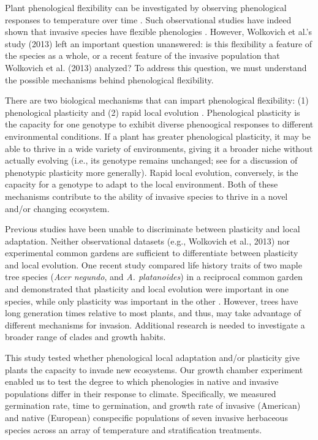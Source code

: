 \documentclass[12pt]{article}\usepackage[]{graphicx}\usepackage[]{color}
\begin{document}
	Plant phenological flexibility can be investigated by observing phenological responses to temperature over time \parencite[e.g.,][]{Schwartz1994,Wolkovich2014}.  Such observational studies have indeed shown that invasive species have flexible phenologies \parencite{Wolkovich2013}. However, Wolkovich et al.’s study (2013) left an important question unanswered: is this flexibility a feature of the species as a whole, or a recent feature of the invasive population that Wolkovich et al. (2013) analyzed? To address this question, we must understand the possible mechanisms behind phenological flexibility.
	
	There are two biological mechanisms that can impart phenological flexibility: (1) phenological plasticity \parencite{Matinsanz2010,Schwartz1994} and (2) rapid local evolution \parencite{Clements2011,Lambrinos2004,Sakai2001}. Phenological plasticity is the capacity for one genotype to exhibit diverse phenoogical responses to different environmental conditions. If a plant has greater phenological plasticity, it may be able to thrive in a wide variety of environments, giving it a broader niche without actually evolving (i.e., its genotype remains unchanged; see \textcite{Richards2006} for a discussion of phenotypic plasticity more generally). Rapid local evolution, conversely, is the capacity for a genotype to adapt to the local environment. Both of these mechanisms contribute to the ability of invasive species to thrive in a novel and/or changing ecosystem.
	
	Previous studies have been unable to discriminate between plasticity and local adaptation. Neither observational datasets (e.g., Wolkovich et al., 2013) nor experimental common gardens \parencite{Conner2004,Vitasse2009} are sufficient to differentiate between plasticity and local evolution. One recent study compared life history traits of two maple tree species (\textit{Acer negundo}, and \textit{A. platanoides}) in a reciprocal common garden and demonstrated that plasticity and local evolution were important in one species, while only plasticity was important in the other \parencite{Lamarque2015}. However, trees have long generation times relative to most plants, and thus, may take advantage of different mechanisms for invasion. Additional research is needed to investigate a broader range of clades and growth habits. 
	
	This study tested whether phenological local adaptation and/or plasticity give plants the capacity to invade new ecosystems. Our growth chamber experiment enabled us to test the degree to which phenologies in native and invasive populations differ in their response to climate.   Specifically, we measured germination rate, time to germination, and growth rate of invasive (American) and native (European) conspecific populations of seven invasive herbaceous species across an array of temperature and stratification treatments.
	
\end{document}
